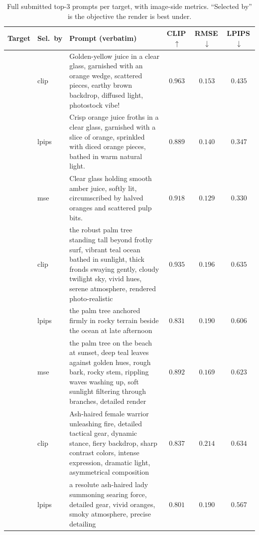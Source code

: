\documentclass[runningheads]{llncs}
\begin{document}
\begin{table}[t]
\centering
\caption{Full submitted top-3 prompts per target, with image-side metrics. ``Selected by'' is the objective the render is best under.}
\label{tab:annex-top3}
\vspace{-2pt}
\scriptsize
\renewcommand{\arraystretch}{1.1}
\begin{tabular}{p{1.5cm} l p{5.6cm} c c c}
\toprule
\textbf{Target} & \textbf{Sel.\ by} & \textbf{Prompt (verbatim)} & \textbf{CLIP\,$\uparrow$} & \textbf{RMSE\,$\downarrow$} & \textbf{LPIPS\,$\downarrow$} \\
\midrule
{} & clip & Golden-yellow juice in a clear glass, garnished with an orange wedge, scattered pieces, earthy brown backdrop, diffused light, photostock vibe! & $0.963$ & $0.153$ & $0.435$ \\
 & lpips & Crisp orange juice froths in a clear glass, garnished with a slice of orange, sprinkled with diced orange pieces, bathed in warm natural light. & $0.889$ & $0.140$ & $0.347$ \\
 & mse & Clear glass holding smooth amber juice, softly lit, circumscribed by halved oranges and scattered pulp bits. & $0.918$ & $0.129$ & $0.330$ \\
\midrule
{} & clip & the robust palm tree standing tall beyond frothy surf, vibrant teal ocean bathed in sunlight, thick fronds swaying gently, cloudy twilight sky, vivid hues, serene atmosphere, rendered photo-realistic & $0.935$ & $0.196$ & $0.635$ \\
 & lpips & the palm tree anchored firmly in rocky terrain beside the ocean at late afternoon & $0.831$ & $0.190$ & $0.606$ \\
 & mse & the palm tree on the beach at sunset, deep teal leaves against golden hues, rough bark, rocky stem, rippling waves washing up, soft sunlight filtering through branches, detailed render & $0.892$ & $0.169$ & $0.623$ \\
\midrule
{} & clip & Ash-haired female warrior unleashing fire, detailed tactical gear, dynamic stance, fiery backdrop, sharp contrast colors, intense expression, dramatic light, asymmetrical composition & $0.837$ & $0.214$ & $0.634$ \\
 & lpips & a resolute ash-haired lady summoning searing force, detailed gear, vivid oranges, smoky atmosphere, precise detailing & $0.801$ & $0.190$ & $0.567$ \\

\end{tabular}
\end{table}
\end{document}
